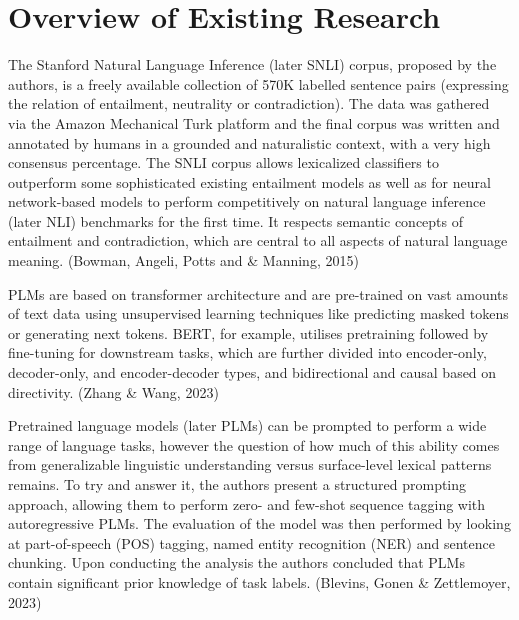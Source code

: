 \documentclass[fleqn,moreauthors,10pt]{ds_report}
\begin{document}

\section*{Overview of Existing Research}

The Stanford Natural Language Inference (later SNLI) corpus, proposed by the authors, is a freely available collection of 570K labelled sentence pairs (expressing the relation of entailment, neutrality or contradiction). The data was gathered via the Amazon Mechanical Turk platform and the final corpus was written and annotated by humans in a grounded and naturalistic context, with a very high consensus percentage. The SNLI corpus allows lexicalized classifiers to outperform some sophisticated existing entailment models as well as for neural network-based models to perform competitively on natural language inference (later NLI) benchmarks for the first time. It respects semantic concepts of entailment and contradiction, which are central to all aspects of natural language meaning. (Bowman, Angeli, Potts and \& Manning, 2015)

PLMs are based on transformer architecture and are pre-trained on vast amounts of text data using unsupervised learning techniques like predicting masked tokens or generating next tokens. BERT, for example, utilises pretraining followed by fine-tuning for downstream tasks, which are further divided into encoder-only, decoder-only, and encoder-decoder types, and bidirectional and causal based on directivity. (Zhang \& Wang, 2023)

Pretrained language models (later PLMs) can be prompted to perform a wide range of language tasks, however the question of how much of this ability comes from generalizable linguistic understanding versus surface-level lexical patterns remains. To try and answer it, the authors present a structured prompting approach, allowing them to perform zero- and few-shot sequence tagging with autoregressive PLMs. The evaluation of the model was then performed by looking at part-of-speech (POS) tagging, named entity recognition (NER) and sentence chunking. Upon conducting the analysis the authors concluded that PLMs contain significant prior knowledge of task labels. (Blevins, Gonen \& Zettlemoyer, 2023)
\end{document}
